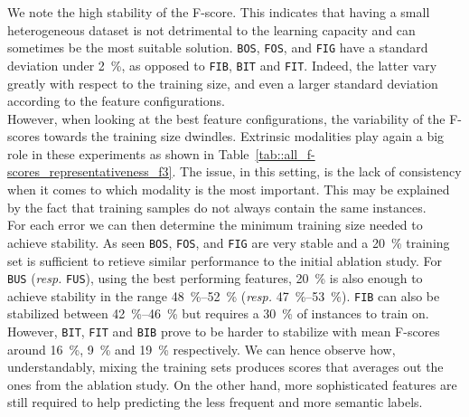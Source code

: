         We note the high stability of the F-score.
        This indicates that having a small heterogeneous dataset is not detrimental to the learning capacity and can sometimes be the most suitable solution.
        \texttt{BOS}, \texttt{FOS}, and \texttt{FIG} have a standard deviation under \SI{2}{\percent}, as opposed to \texttt{FIB}, \texttt{BIT} and \texttt{FIT}.
        Indeed, the latter vary greatly with respect to the training size, and even a larger standard deviation according to the feature configurations.\\

        However, when looking at the best feature configurations, the variability of the F-scores towards the training size dwindles.
        Extrinsic modalities play again a big role in these experiments as shown in Table~\ref{tab::all_f-scores_representativeness_f3}.
        The issue, in this setting, is the lack of consistency when it comes to which modality is the most important.
        This may be explained by the fact that training samples do not always contain the same instances.\\

        For each error we can then determine the minimum training size needed to achieve stability.
        As seen \texttt{BOS}, \texttt{FOS}, and \texttt{FIG} are very stable and a \SI{20}{\percent} training set is sufficient to retieve similar performance to the initial ablation study.
        For \texttt{BUS} (\textit{resp.} \texttt{FUS}), using the best performing features, \SI{20}{\percent} is also enough to achieve stability in the range \SIrange{48}{52}{\percent} (\textit{resp.} \SIrange{47}{53}{\percent}).
        \texttt{FIB} can also be stabilized between \SIrange[range-phrase={ and }]{42}{46}{\percent} but requires a \SI{30}{\percent} of instances to train on.
        However, \texttt{BIT}, \texttt{FIT} and \texttt{BIB} prove to be harder to stabilize with mean F-scores around \SI{16}{\percent}, \SI{9}{\percent} and \SI{19}{\percent} respectively.
        We can hence observe how, understandably, mixing the training sets produces scores that averages out the ones from the ablation study.
        On the other hand, more sophisticated features are still required to help predicting the less frequent and more semantic labels.

